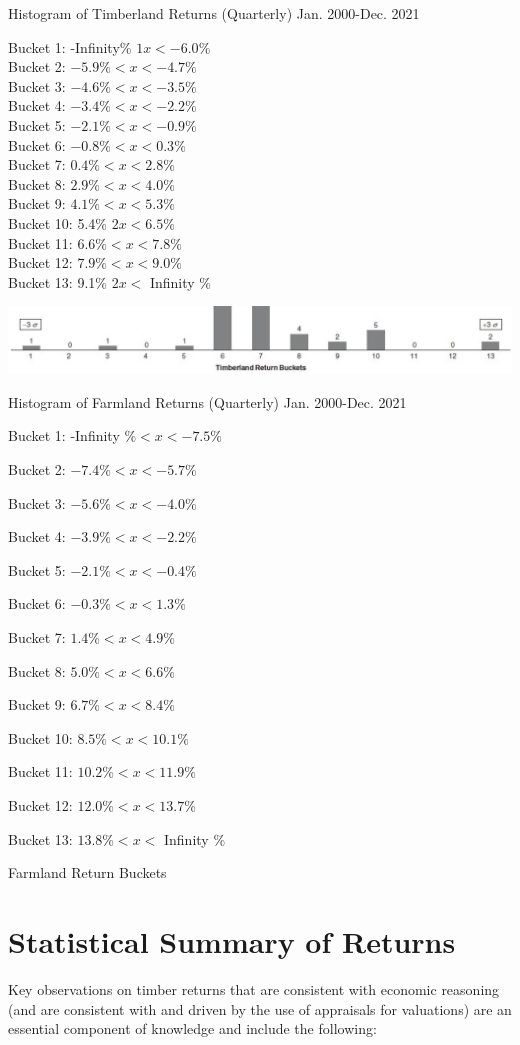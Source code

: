 \documentclass[11pt]{article}
\begin{document}
Histogram of Timberland Returns (Quarterly) Jan. 2000-Dec. 2021

Bucket 1: -Infinity\% $1 x<-6.0 \%$\\
Bucket 2: $-5.9 \%<x<-4.7 \%$\\
Bucket 3: $-4.6 \%<x<-3.5 \%$\\
Bucket 4: $-3.4 \%<x<-2.2 \%$\\
Bucket 5: $-2.1 \%<x<-0.9 \%$\\
Bucket 6: $-0.8 \%<x<0.3 \%$\\
Bucket 7: $0.4 \%<x<2.8 \%$\\
Bucket 8: $2.9 \%<x<4.0 \%$\\
Bucket 9: $4.1 \%<x<5.3 \%$\\
Bucket 10: 5.4\% $2 x<6.5 \%$\\
Bucket 11: $6.6 \%<x<7.8 \%$\\
Bucket 12: $7.9 \%<x<9.0 \%$\\
Bucket 13: 9.1\% $2 x<$ Infinity \%

\begin{center}
\includegraphics[max width=\textwidth]{2024_04_10_b4591cb000ecad44f255g-3}
\end{center}

Histogram of Farmland Returns (Quarterly) Jan. 2000-Dec. 2021

Bucket 1: -Infinity $\%<x<-7.5 \%$

Bucket 2: $-7.4 \%<x<-5.7 \%$

Bucket 3: $-5.6 \%<x<-4.0 \%$

Bucket 4: $-3.9 \%<x<-2.2 \%$

Bucket 5: $-2.1 \%<x<-0.4 \%$

Bucket 6: $-0.3 \%<x<1.3 \%$

Bucket 7: $1.4 \%<x<4.9 \%$

Bucket 8: $5.0 \%<x<6.6 \%$

Bucket 9: $6.7 \%<x<8.4 \%$

Bucket 10: $8.5 \%<x<10.1 \%$

Bucket 11: $10.2 \%<x<11.9 \%$

Bucket 12: $12.0 \%<x<13.7 \%$

Bucket 13: $13.8 \%<x<$ Infinity $\%$

Farmland Return Buckets

\section*{Statistical Summary of Returns}
Key observations on timber returns that are consistent with economic reasoning (and are consistent with and driven by the use of appraisals for valuations) are an essential component of knowledge and include the following:
\end{document}
